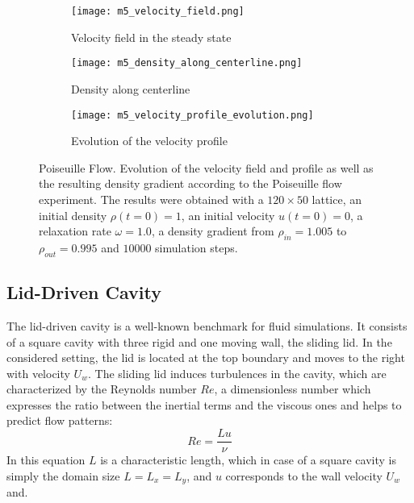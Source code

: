\begin{figure}[ht!]
    \begin{subfigure}{0.53\linewidth}
        \centering
        \texttt{[image: m5\_velocity\_field.png]}
        \caption{Velocity field in the steady state}
        \label{fig:poiseuille:flow-field}
    \end{subfigure}%
    \begin{subfigure}{0.47\linewidth}
        \centering
        \texttt{[image: m5\_density\_along\_centerline.png]}
        \caption{Density along centerline}
        \label{fig:poiseuille:density-centerline}
    \end{subfigure}

    \begin{subfigure}{\linewidth}
        \centering
        \texttt{[image: m5\_velocity\_profile\_evolution.png]}
        \caption{Evolution of the velocity profile}
        \label{fig:poiseuille:profile}
    \end{subfigure}
    \caption[Poiseuille Flow]{Poiseuille Flow. Evolution of the velocity field and profile as well as the resulting density gradient according to the Poiseuille flow experiment. The results were obtained with a $120\times50$ lattice, an initial density $\rho(t=0)=1$, an initial velocity $u(t=0)=0$, a relaxation rate $\omega=1.0$, a density gradient from $\rho_{in}=1.005$ to $\rho_{out}=0.995$ and $10000$ simulation steps.}
    \label{fig:poiseuille}
\end{figure}

\subsection{Lid-Driven Cavity}

The lid-driven cavity is a well-known benchmark for fluid simulations. It consists of a square cavity with three rigid and one moving wall, the sliding lid. In the considered setting, the lid is located at the top boundary and moves to the right with velocity $U_w$. The sliding lid induces turbulences in the cavity, which are characterized by the Reynolds number $Re$, a dimensionless number which expresses the ratio between the inertial terms and the viscous ones and helps to predict flow patterns:
\begin{equation}
    \label{eq:reynolds-number}
    Re = \frac{Lu}{\nu}
\end{equation}
In this equation $L$ is a characteristic length, which in case of a square cavity is simply the domain size $L=L_x=L_y$, and $u$ corresponds to the wall velocity $U_w$ and.

